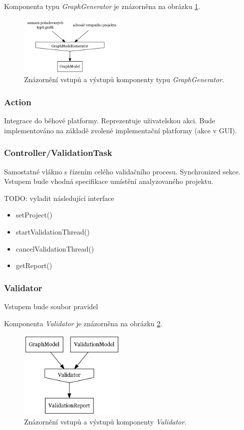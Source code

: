 Komponenta typu \emph{GraphGenerator} je znázorněna na obrázku \ref{design-graph_generator_io}.

\begin{figure}[h!]
  \centering
  \includegraphics[width=0.45\textwidth]{./graphs/graph_generator_io_graph.png}
  \caption{Znázornění vstupů a výstupů komponenty typu \emph{GraphGenerator}.\label{design-graph_generator_io}}
\end{figure}

\subsubsection{Action}
Integrace do běhové platformy. Reprezentuje uživatelskou akci. Bude implementováno na základě zvolené implementační platformy (akce v GUI).

\subsubsection{Controller/ValidationTask}
Samostatné vlákno s řízením celého validačního procesu. Synchronized sekce. Vstupem bude vhodná specifikace umístění analyzovaného projektu.

TODO: vyladit následující interface
\begin{itemize}
\item setProject()
\item startValidationThread()
\item cancelValidationThread()
\item getReport()
\end{itemize}

\subsubsection{Validator}
Vstupem bude soubor pravidel

Komponenta \emph{Validator} je znázorněna na obrázku \ref{design-validator_io}.

\begin{figure}[h!]
  \centering
  \includegraphics[width=0.45\textwidth]{./graphs/validator_io_graph.png}
  \caption{Znázornění vstupů a výstupů komponenty \emph{Validator}.\label{design-validator_io}}
\end{figure}

